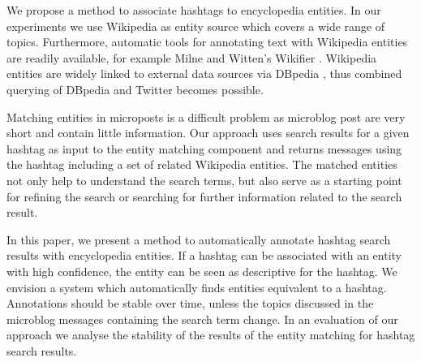 \documentclass{llncs}
\newcommand{\nop}[1]{}
\begin{document}
We propose a method to associate hashtags to encyclopedia entities.
In our experiments we use Wikipedia as entity source which covers a wide range of topics.
Furthermore, automatic tools for annotating text with Wikipedia entities are readily available, for example Milne and Witten's Wikifier \cite{key:wikifier}.
Wikipedia entities are widely linked to external data sources via DBpedia \cite{key:dbpedia}, thus combined querying of DBpedia and Twitter becomes possible.

Matching entities in microposts is a difficult problem \cite{key:clef} as microblog post are very short and contain little information.
Our approach uses search results for a given hashtag as input to the entity matching component and returns messages using the hashtag including a set of related Wikipedia entities.
The matched entities not only help to understand the search terms, but also serve as a starting point for refining the search or searching for further information related to the search result.


\nop{
Finding entities matching a query, especially a query for a given hashtag is difficult as little context is available due to the short length of each single message.
}

In this paper, we present a method to automatically annotate hashtag search results with encyclopedia entities.
If a hashtag can be associated with an entity with high confidence, the entity can be seen as descriptive for the hashtag.
We envision a system which automatically finds entities equivalent to a hashtag.
Annotations should be stable over time, unless the topics discussed in the microblog messages containing the search term change.
In an evaluation of our approach we analyse the stability of the results of the entity matching for hashtag search results.
\end{document}
